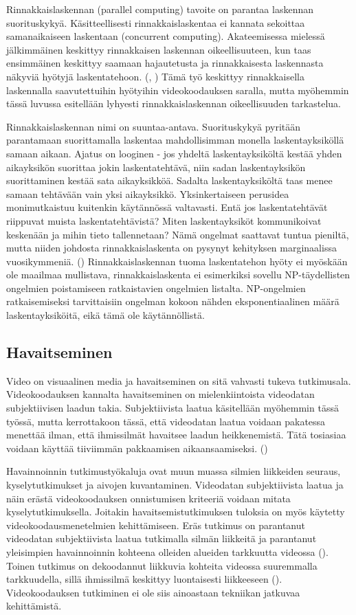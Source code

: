 Rinnakkaislaskennan (parallel computing) tavoite on parantaa laskennan
suorituskykyä. Käsitteellisesti rinnakkaislaskentaa ei kannata sekoittaa
samanaikaiseen laskentaan (concurrent computing). Akateemisessa mielessä
jälkimmäinen keskittyy rinnakkaisen laskennan oikeellisuuteen, kun taas
ensimmäinen keskittyy saamaan hajautetusta ja rinnakkaisesta laskennasta
näkyviä hyötyjä laskentatehoon. (\citealt{intro}, \citealt{ari}) Tämä työ keskittyy
rinnakkaisella laskennalla saavutettuihin hyötyihin videokoodauksen saralla,
mutta myöhemmin tässä luvussa esitellään lyhyesti rinnakkaislaskennan
oikeellisuuden tarkastelua.

Rinnakkaislaskennan nimi on suuntaa-antava. Suorituskykyä pyritään parantamaan
suorittamalla laskentaa mahdollisimman monella laskentayksiköllä samaan aikaan.
Ajatus on looginen - jos yhdeltä laskentayksiköltä kestää yhden aikayksikön
suorittaa jokin laskentatehtävä, niin sadan laskentayksikön suorittaminen
kestää sata aikayksikköä. Sadalta laskentayksiköltä taas menee samaan tehtävään
vain yksi aikayksikkö. Yksinkertaiseen perusidea monimutkaistuu kuitenkin
käytännössä valtavasti. Entä jos laskentatehtävät riippuvat muista
laskentatehtävistä? Miten laskentayksiköt kommunikoivat keskenään ja mihin
tieto tallennetaan? Nämä ongelmat saattavat tuntua pieniltä, mutta niiden
johdosta rinnakkaislaskenta on pysynyt kehityksen marginaalissa vuosikymmeniä.
(\citealt{intro}) Rinnakkaislaskennan tuoma laskentatehon hyöty ei myöskään ole
maailmaa mullistava, rinnakkaislaskenta ei esimerkiksi sovellu NP-täydellisten
ongelmien poistamiseen ratkaistavien ongelmien listalta. NP-ongelmien
ratkaisemiseksi tarvittaisiin ongelman kokoon nähden eksponentiaalinen määrä
laskentayksiköitä, eikä tämä ole käytännöllistä.

\subsection{Havaitseminen}

Video on visuaalinen media ja havaitseminen on sitä vahvasti tukeva
tutkimusala. Videokoodauksen kannalta havaitseminen on mielenkiintoista
videodatan subjektiivisen laadun takia. Subjektiivista laatua käsitellään
myöhemmin tässä työssä, mutta kerrottakoon tässä, että videodatan laatua
voidaan pakatessa menettää ilman, että ihmissilmät havaitsee laadun
heikkenemistä. Tätä tosiasiaa voidaan käyttää tiiviimmän pakkaamisen
aikaansaamiseksi. (\citealt{h264})

Havainnoinnin tutkimustyökaluja ovat muun muassa silmien liikkeiden seuraus,
kyselytutkimukset ja aivojen kuvantaminen. Videodatan subjektiivista laatua
ja näin erästä videokoodauksen onnistumisen kriteeriä voidaan mitata
kyselytutkimuksella. Joitakin havaitsemistutkimuksen tuloksia on myös käytetty
videokoodausmenetelmien kehittämiseen. Eräs tutkimus on parantanut videodatan
subjektiivista laatua tutkimalla silmän liikkeitä ja parantanut yleisimpien
havainnoinnin kohteena olleiden alueiden tarkkuutta videossa
(\citealt{perception}). Toinen tutkimus on dekoodannut liikkuvia kohteita
videossa suuremmalla tarkkuudella, sillä ihmissilmä keskittyy luontaisesti
liikkeeseen (\citealt{lee}). Videokoodauksen tutkiminen ei ole siis ainoastaan
tekniikan jatkuvaa kehittämistä.


